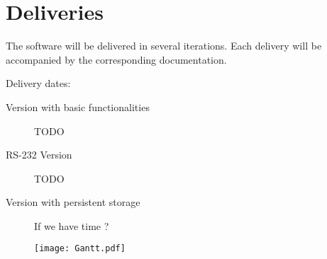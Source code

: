 \documentclass{article}
\begin{document}
    \section{Deliveries}
      The software will be delivered in several iterations.
      Each delivery will be accompanied by the corresponding documentation.

      Delivery dates:
      \begin{description}
        \item[Version with basic functionalities] TODO
        \item[RS-232 Version] TODO
        \item[Version with persistent storage] If we have time ?
      \end{description}

    \thispagestyle{empty}
    \begin{figure}
      \centering
      \texttt{[image: Gantt.pdf]}
      \label{fig:gantt}
    \end{figure}
    \clearpage
    \restoregeometry
\end{document}
